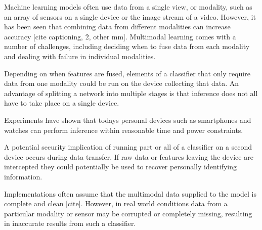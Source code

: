 Machine learning models often use data from a single view, or modality, such as an array of sensors on a single device or the image stream of a video. However, it has been seen that combining data from different modalities can increase accuracy [cite captioning, 2, other mm]. Multimodal learning comes with a number of challenges, including deciding when to fuse data from each modality and dealing with failure in individual modalities.

Depending on when features are fused, elements of a classifier that only require data from one modality could be run on the device collecting that data.
An advantage of splitting a network into multiple stages is that inference does not all have to take place on a single device.

Experiments \cite{RaduMultimodal,CNNwatch,snapdragon} have shown that todays personal devices such as smartphones and watches can perform inference within reasonable time and power constraints.

A potential security implication of running part or all of a classifier on a second device occurs during data transfer. If raw data or features leaving the device are intercepted they could potentially be used to recover personally identifying information.

Implementations often assume that the multimodal data supplied to the model is complete and clean [cite]. However, in real world conditions data from a particular modality or sensor may be corrupted or completely missing, resulting in inaccurate results from such a classifier.
